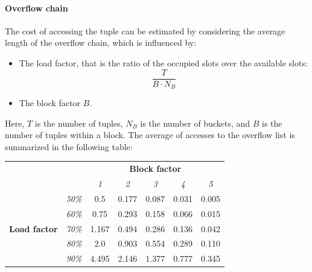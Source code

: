 \paragraph*{Overflow chain}
The cost of accessing the tuple can be estimated by considering the average length of the overflow chain, which is influenced by:
\begin{itemize}
    \item The load factor, that is the ratio of the occupied slots over the available slots:
        \[\dfrac{T}{B \cdot N_B}\]
    \item The block factor $B$. 
\end{itemize}
Here, $T$ is the number of tuples, $N_B$ is the number of buckets, and $B$ is the number of tuples within a block. 
The average of accesses to the overflow list is summarized in the following table: 
\begin{table}[H]
    \centering
    \begin{tabular}{ccccccc}
                                                               & \textit{}                         & \multicolumn{5}{c}{\textbf{Block factor}}                                                                                                                               \\ \cline{3-7} 
    \textit{}                                                  & \multicolumn{1}{c|}{}             & \multicolumn{1}{c|}{\textit{1}} & \multicolumn{1}{c|}{\textit{2}} & \multicolumn{1}{c|}{\textit{3}} & \multicolumn{1}{c|}{\textit{4}} & \multicolumn{1}{c|}{\textit{5}} \\ \cline{2-7} 
    \multicolumn{1}{c|}{\multirow{5}{*}{\textbf{Load factor}}} & \multicolumn{1}{c|}{\textit{50\%}} & \multicolumn{1}{c|}{0.5}        & \multicolumn{1}{c|}{0.177}      & \multicolumn{1}{c|}{0.087}      & \multicolumn{1}{c|}{0.031}      & \multicolumn{1}{c|}{0.005}      \\ \cline{2-7} 
    \multicolumn{1}{c|}{}                                      & \multicolumn{1}{c|}{\textit{60\%}} & \multicolumn{1}{c|}{0.75}       & \multicolumn{1}{c|}{0.293}      & \multicolumn{1}{c|}{0.158}      & \multicolumn{1}{c|}{0.066}      & \multicolumn{1}{c|}{0.015}      \\ \cline{2-7} 
    \multicolumn{1}{c|}{}                                      & \multicolumn{1}{c|}{\textit{70\%}} & \multicolumn{1}{c|}{1.167}      & \multicolumn{1}{c|}{0.494}      & \multicolumn{1}{c|}{0.286}      & \multicolumn{1}{c|}{0.136}      & \multicolumn{1}{c|}{0.042}      \\ \cline{2-7} 
    \multicolumn{1}{c|}{}                                      & \multicolumn{1}{c|}{\textit{80\%}} & \multicolumn{1}{c|}{2.0}        & \multicolumn{1}{c|}{0.903}      & \multicolumn{1}{c|}{0.554}      & \multicolumn{1}{c|}{0.289}      & \multicolumn{1}{c|}{0.110}      \\ \cline{2-7} 
    \multicolumn{1}{c|}{}                                      & \multicolumn{1}{c|}{\textit{90\%}} & \multicolumn{1}{c|}{4.495}      & \multicolumn{1}{c|}{2.146}      & \multicolumn{1}{c|}{1.377}      & \multicolumn{1}{c|}{0.777}      & \multicolumn{1}{c|}{0.345}      \\ \cline{2-7} 
    \end{tabular}
\end{table}
